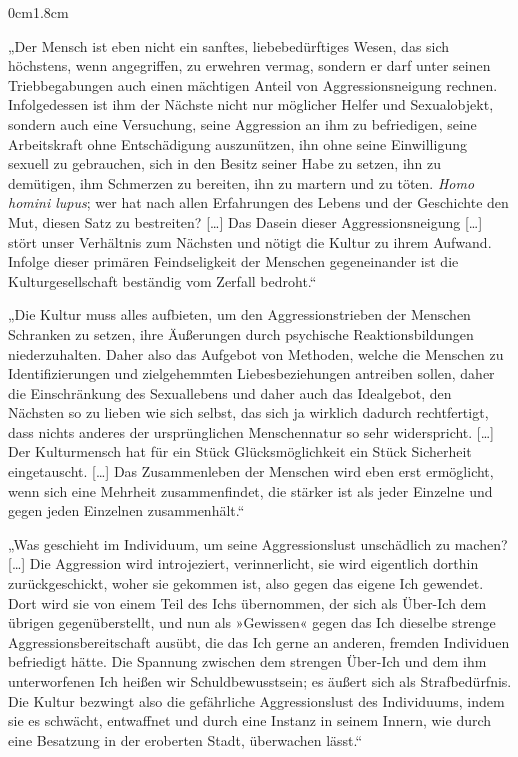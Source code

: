 \documentclass[a4paper, 11pt, parskip=half]{scrartcl}
\begin{document}
\begin{adjustwidth}{0cm}{1.8cm}
\normalsize\linespread{1.12}\selectfont
\begin{linenumbers}

\noindent „Der Mensch ist eben nicht ein sanftes, liebebedürftiges Wesen, das sich höchstens, wenn 
angegriffen, zu erwehren vermag, sondern er darf unter seinen Triebbegabungen auch einen 
mächtigen Anteil von Aggressionsneigung rechnen. Infolgedessen ist ihm der Nächste nicht nur 
möglicher Helfer und Sexualobjekt, sondern auch eine Versuchung, seine Aggression an ihm zu 
befriedigen, seine Arbeitskraft ohne Entschädigung auszunützen, ihn ohne seine Einwilligung 
sexuell zu gebrauchen, sich in den Besitz seiner Habe zu setzen, ihn zu demütigen, ihm 
Schmerzen zu bereiten, ihn zu martern und zu töten. \textit{Homo homini lupus}; wer hat nach allen 
Erfahrungen des Lebens und der Geschichte den Mut, diesen Satz zu bestreiten? [\dots] Das 
Dasein dieser Aggressionsneigung [\dots] stört unser Verhältnis zum Nächsten und nötigt die 
Kultur zu ihrem Aufwand. Infolge dieser primären Feindseligkeit der Menschen gegeneinander 
ist die Kulturgesellschaft beständig vom Zerfall bedroht.“

\vspace{0.4cm}
\noindent „Die Kultur muss alles aufbieten, um den Aggressionstrieben der Menschen Schranken zu 
setzen, ihre Äußerungen durch psychische Reaktionsbildungen niederzuhalten. Daher also das 
Aufgebot von Methoden, welche die Menschen zu Identifizierungen und zielgehemmten 
Liebesbeziehungen antreiben sollen, daher die Einschränkung des Sexuallebens und daher 
auch das Idealgebot, den Nächsten so zu lieben wie sich selbst, das sich ja wirklich 
dadurch rechtfertigt, dass nichts anderes der ursprünglichen Menschennatur so sehr 
widerspricht. [\dots] Der Kulturmensch hat für ein Stück Glücksmöglichkeit ein Stück 
Sicherheit eingetauscht. [\dots] Das Zusammenleben der Menschen wird eben erst ermöglicht, 
wenn sich eine Mehrheit zusammenfindet, die stärker ist als jeder Einzelne und gegen 
jeden Einzelnen zusammenhält.“

\vspace{0.4cm}
\noindent „Was geschieht im Individuum, um seine Aggressionslust unschädlich zu machen? [\dots] Die 
Aggression wird introjeziert, verinnerlicht, sie wird eigentlich dorthin zurückgeschickt, 
woher sie gekommen ist, also gegen das eigene Ich gewendet. Dort wird sie von einem 
Teil des Ichs übernommen, der sich als Über-Ich dem übrigen gegenüberstellt, und nun als 
»Gewissen« gegen das Ich dieselbe strenge Aggressionsbereitschaft ausübt, die das Ich 
gerne an anderen, fremden Individuen befriedigt hätte. Die Spannung zwischen dem 
strengen Über-Ich und dem ihm unterworfenen Ich heißen wir Schuldbewusstsein; es 
äußert sich als Strafbedürfnis. Die Kultur bezwingt also die gefährliche Aggressionslust 
des Individuums, indem sie es schwächt, entwaffnet und durch eine Instanz in seinem 
Innern, wie durch eine Besatzung in der eroberten Stadt, überwachen lässt.“


\end{linenumbers}
\end{adjustwidth}
\end{document}
